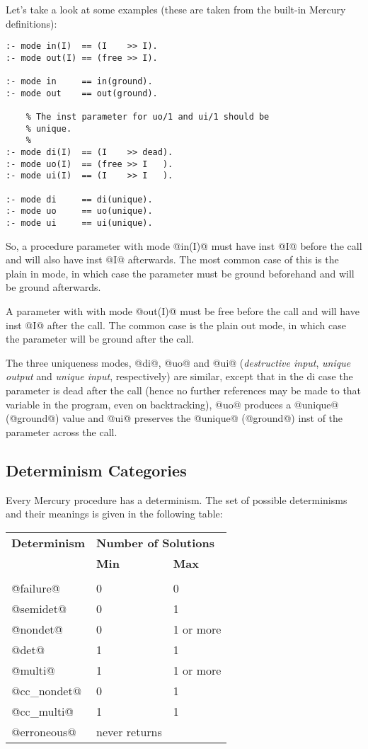 \documentclass[a4paper,11pt,notitlepage,onecolumn]{article}
\begin{document}
Let's take a look at some examples (these are taken from
the built-in Mercury definitions):
\begin{verbatim}
:- mode in(I)  == (I    >> I).
:- mode out(I) == (free >> I).

:- mode in     == in(ground).
:- mode out    == out(ground).

    % The inst parameter for uo/1 and ui/1 should be
    % unique.
    %
:- mode di(I)  == (I    >> dead).
:- mode uo(I)  == (free >> I   ).
:- mode ui(I)  == (I    >> I   ).

:- mode di     == di(unique).
:- mode uo     == uo(unique).
:- mode ui     == ui(unique).
\end{verbatim}

So, a procedure parameter with mode @in(I)@ must have inst @I@
before the call and will also have inst @I@ afterwards.  The
most common case of this is the plain in mode, in which
case the parameter must be ground beforehand and will be
ground afterwards.

A parameter with with mode @out(I)@ must be free before the
call and will have inst @I@ after the call.  The common case
is the plain out mode, in which case the parameter will
be ground after the call.

The three uniqueness modes, @di@, @uo@ and @ui@ (\emph{destructive
input}, \emph{unique output} and \emph{unique input}, respectively)
are similar, except that in the di case the parameter is
dead after the call (hence no further references may be
made to that variable in the program, even on
backtracking), @uo@ produces a @unique@ (@ground@) value and @ui@
preserves the @unique@ (@ground@) inst of the parameter across
the call.

\subsection{Determinism Categories}

Every Mercury procedure has a determinism.  The set of
possible determinisms and their meanings is given in the
following table:

\begin{tabular}{lll}
\textbf{Determinism} & \multicolumn{2}{l}{\textbf{Number of Solutions}} \\
                     & \textbf{Min} & \textbf{Max} \\
\hline \\
@failure@            & 0            & 0 \\
@semidet@            & 0            & 1 \\
@nondet@             & 0            & 1 or more \\
@det@                & 1            & 1 \\
@multi@              & 1            & 1 or more \\
@cc_nondet@          & 0            & 1 \\
@cc_multi@           & 1            & 1 \\
@erroneous@          & never returns \\
\end{tabular}
\end{document}

